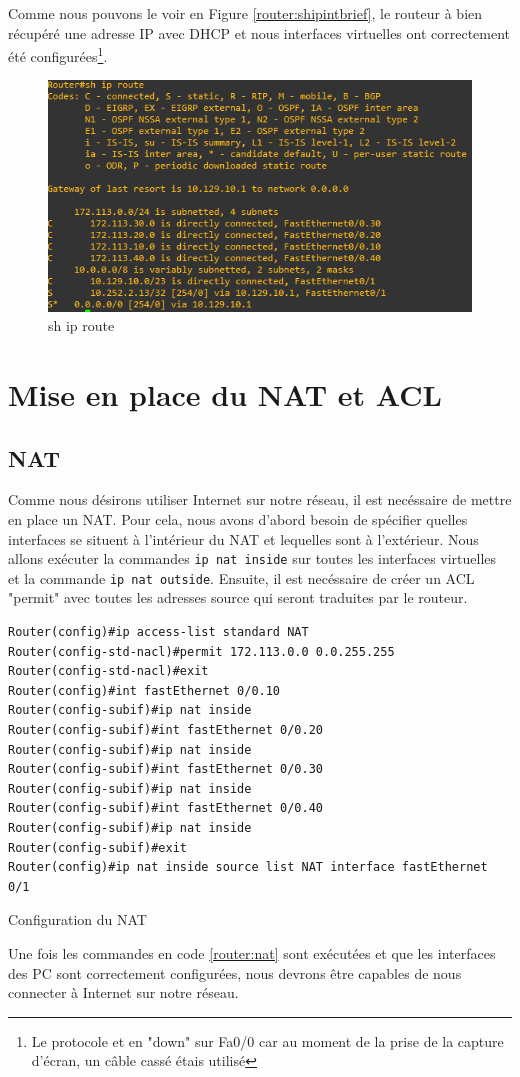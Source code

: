 \documentclass{article}
\begin{document}
Comme nous pouvons le voir en Figure \ref{router:shipintbrief}, le routeur à bien récupéré une adresse IP avec DHCP et nous interfaces virtuelles ont correctement été configurées\footnote{Le protocole et en "down" sur Fa0/0 car au moment de la prise de la capture d'écran, un câble cassé étais utilisé}.
\begin{figure}[H]
    \begin{center}
        \includegraphics[scale=0.75]{fig/shiproute.png}
    \end{center}
    \caption{sh ip route}
    \label{router:shiproute}
\end{figure}
\section{Mise en place du NAT et ACL}
\subsection{NAT}
Comme nous désirons utiliser Internet sur notre réseau, il est necéssaire de mettre en place un NAT. Pour cela, nous avons d'abord besoin de spécifier quelles interfaces se situent à l'intérieur du NAT et lequelles sont à l'extérieur.
Nous allons exécuter la commandes \verb|ip nat inside| sur toutes les interfaces virtuelles et la commande \verb|ip nat outside|. Ensuite, il est necéssaire de créer un ACL "permit" avec toutes les adresses source qui seront traduites par le routeur.
\begin{listing}[H]
    \begin{verbatim}
Router(config)#ip access-list standard NAT
Router(config-std-nacl)#permit 172.113.0.0 0.0.255.255
Router(config-std-nacl)#exit
Router(config)#int fastEthernet 0/0.10
Router(config-subif)#ip nat inside
Router(config-subif)#int fastEthernet 0/0.20
Router(config-subif)#ip nat inside
Router(config-subif)#int fastEthernet 0/0.30
Router(config-subif)#ip nat inside
Router(config-subif)#int fastEthernet 0/0.40
Router(config-subif)#ip nat inside
Router(config-subif)#exit
Router(config)#ip nat inside source list NAT interface fastEthernet 0/1
    \end{verbatim}
    \caption{Configuration du NAT}
    \label{router:nat}
\end{listing}
Une fois les commandes en code \ref{router:nat} sont exécutées et que les interfaces des PC sont correctement configurées, nous devrons être capables de nous connecter à Internet sur notre réseau.
\end{document}
